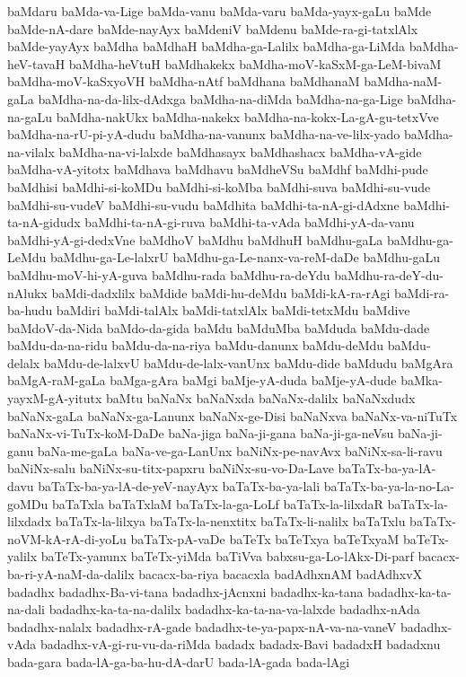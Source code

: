 {baMdaru
baMda-va-Lige
baMda-vanu
baMda-varu
baMda-yayx-gaLu
baMde
baMde-nA-dare
baMde-nayAyx
baMdeniV
baMdenu
baMde-ra-gi-tatxlAlx
baMde-yayAyx
baMdha
baMdhaH
baMdha-ga-Lalilx
baMdha-ga-LiMda
baMdha-heV-tavaH
baMdha-heVtuH
baMdhakekx
baMdha-moV-kaSxM-ga-LeM-bivaM
baMdha-moV-kaSxyoVH
baMdha-nAtf
baMdhana
baMdhanaM
baMdha-naM-gaLa
baMdha-na-da-lilx-dAdxga
baMdha-na-diMda
baMdha-na-ga-Lige
baMdha-na-gaLu
baMdha-nakUkx
baMdha-nakekx
baMdha-na-kokx-La-gA-gu-tetxVve
baMdha-na-rU-pi-yA-dudu
baMdha-na-vanunx
baMdha-na-ve-lilx-yado
baMdha-na-vilalx
baMdha-na-vi-lalxde
baMdhasayx
baMdhashacx
baMdha-vA-gide
baMdha-vA-yitotx
baMdhava
baMdhavu
baMdheVSu
baMdhf
baMdhi-pude
baMdhisi
baMdhi-si-koMDu
baMdhi-si-koMba
baMdhi-suva
baMdhi-su-vude
baMdhi-su-vudeV
baMdhi-su-vudu
baMdhita
baMdhi-ta-nA-gi-dAdxne
baMdhi-ta-nA-gidudx
baMdhi-ta-nA-gi-ruva
baMdhi-ta-vAda
baMdhi-yA-da-vanu
baMdhi-yA-gi-dedxVne
baMdhoV
baMdhu
baMdhuH
baMdhu-gaLa
baMdhu-ga-LeMdu
baMdhu-ga-Le-lalxrU
baMdhu-ga-Le-nanx-va-reM-daDe
baMdhu-gaLu
baMdhu-moV-hi-yA-guva
baMdhu-rada
baMdhu-ra-deYdu
baMdhu-ra-deY-du-nAlukx
baMdi-dadxlilx
baMdide
baMdi-hu-deMdu
baMdi-kA-ra-rAgi
baMdi-ra-ba-hudu
baMdiri
baMdi-talAlx
baMdi-tatxlAlx
baMdi-tetxMdu
baMdive
baMdoV-da-Nida
baMdo-da-gida
baMdu
baMduMba
baMduda
baMdu-dade
baMdu-da-na-ridu
baMdu-da-na-riya
baMdu-danunx
baMdu-deMdu
baMdu-delalx
baMdu-de-lalxvU
baMdu-de-lalx-vanUnx
baMdu-dide
baMdudu
baMgAra
baMgA-raM-gaLa
baMga-gAra
baMgi
baMje-yA-duda
baMje-yA-dude
baMka-yayxM-gA-yitutx
baMtu
baNaNx
baNaNxda
baNaNx-dalilx
baNaNxdudx
baNaNx-gaLa
baNaNx-ga-Lanunx
baNaNx-ge-Disi
baNaNxva
baNaNx-va-niTuTx
baNaNx-vi-TuTx-koM-DaDe
baNa-jiga
baNa-ji-gana
baNa-ji-ga-neVsu
baNa-ji-ganu
baNa-me-gaLa
baNa-ve-ga-LanUnx
baNiNx-pe-navAvx
baNiNx-sa-li-ravu
baNiNx-salu
baNiNx-su-titx-papxru
baNiNx-su-vo-Da-Lave
baTaTx-ba-ya-lA-davu
baTaTx-ba-ya-lA-de-yeV-nayAyx
baTaTx-ba-ya-lali
baTaTx-ba-ya-la-no-La-goMDu
baTaTxla
baTaTxlaM
baTaTx-la-ga-LoLf
baTaTx-la-lilxdaR
baTaTx-la-lilxdadx
baTaTx-la-lilxya
baTaTx-la-nenxtitx
baTaTx-li-nalilx
baTaTxlu
baTaTx-noVM-kA-rA-di-yoLu
baTaTx-pA-vaDe
baTeTx
baTeTxya
baTeTxyaM
baTeTx-yalilx
baTeTx-yanunx
baTeTx-yiMda
baTiVva
babxsu-ga-Lo-lAkx-Di-parf
bacacx-ba-ri-yA-naM-da-dalilx
bacacx-ba-riya
bacacxla
badAdhxnAM
badAdhxvX
badadhx
badadhx-Ba-vi-tana
badadhx-jAcnxni
badadhx-ka-tana
badadhx-ka-ta-na-dali
badadhx-ka-ta-na-dalilx
badadhx-ka-ta-na-va-lalxde
badadhx-nAda
badadhx-nalalx
badadhx-rA-gade
badadhx-te-ya-papx-nA-va-na-vaneV
badadhx-vAda
badadhx-vA-gi-ru-vu-da-riMda
badadx
badadx-Bavi
badadxH
badadxnu
bada-gara
bada-lA-ga-ba-hu-dA-darU
bada-lA-gada
bada-lAgi
}
